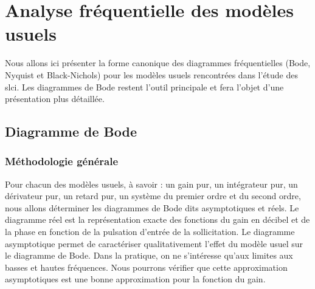 \section{Analyse fréquentielle des modèles usuels}
Nous allons ici présenter la forme canonique des diagrammes fréquentielles 
(Bode, Nyquist et Black-Nichols) pour les modèles usuels rencontrées dans 
l'étude des \gls{slci}. Les diagrammes de Bode restent l'outil principale et 
fera l'objet d'une présentation plus détaillée.
\subsection{Diagramme de Bode}
\subsubsection{Méthodologie générale}
Pour chacun des modèles usuels, à savoir : un gain pur, un intégrateur pur,
un dérivateur pur, un retard pur, un système du premier ordre et du second 
ordre, nous allons déterminer les diagrammes de Bode dits asymptotiques 
et réels. Le diagramme réel est la représentation exacte des fonctions du gain
en décibel et de la phase en fonction de la pulsation d'entrée de 
la sollicitation. Le diagramme asymptotique permet de caractériser 
qualitativement l'effet du modèle usuel sur le diagramme de Bode. 
Dans la pratique, on ne s'intéresse qu'aux limites aux basses et hautes 
fréquences. Nous pourrons vérifier que cette approximation asymptotiques est une
bonne approximation pour la fonction du gain.

